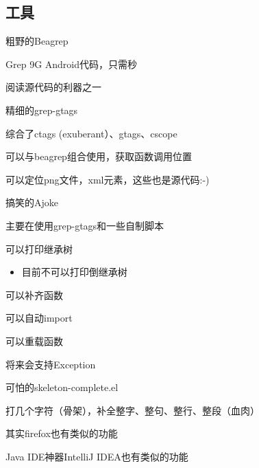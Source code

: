 \documentclass[presentation,dvipdfmx,CJKbookmarks]{beamer}
\begin{document}
\begin{CJK*}{UTF8}{simsun}
\section{工具}
\label{sec:orgb17983e}
\begin{frame}[label={sec:orge5fb37d}]{粗野的\thinspace Beagrep}
\begin{block}{Grep 9G Android\thinspace 代码，只需\thinspace 秒}
\end{block}
\begin{block}{阅读源代码的利器之一}
\end{block}
\end{frame}
\begin{frame}[label={sec:org1008e00}]{精细的\thinspace grep-gtags}
\begin{block}{综合了\thinspace ctags (exuberant）、gtags、cscope}
\end{block}
\begin{block}{可以与\thinspace beagrep\thinspace 组合使用，获取函数调用位置}
\end{block}
\begin{block}{可以定位\thinspace png\thinspace 文件，xml\thinspace 元素，这些也是源代码:-)}
\end{block}
\end{frame}
\begin{frame}[label={sec:orgc672857}]{搞笑的\thinspace Ajoke}
\begin{block}{主要在使用\thinspace grep-gtags\thinspace 和一些自制脚本}
\end{block}
\begin{block}{可以打印继承树}
\begin{itemize}
\item 目前不可以打印倒继承树
\end{itemize}
\end{block}
\begin{block}{可以补齐函数}
\end{block}
\begin{block}{可以自动\thinspace import}
\end{block}
\begin{block}{可以重载函数}
\end{block}
\begin{block}{将来会支持\thinspace Exception}
\end{block}
\end{frame}
\begin{frame}[label={sec:orgb24131a}]{可怕的\thinspace skeleton-complete.el}
\begin{block}{打几个字符（骨架），补全整字、整句、整行、整段（血肉）}
\end{block}
\begin{block}{其实\thinspace firefox\thinspace 也有类似的功能}
\end{block}
\begin{block}{Java IDE\thinspace 神器\thinspace IntelliJ IDEA\thinspace 也有类似的功能}
\end{block}
\end{frame}


\end{CJK*}
\end{document}
